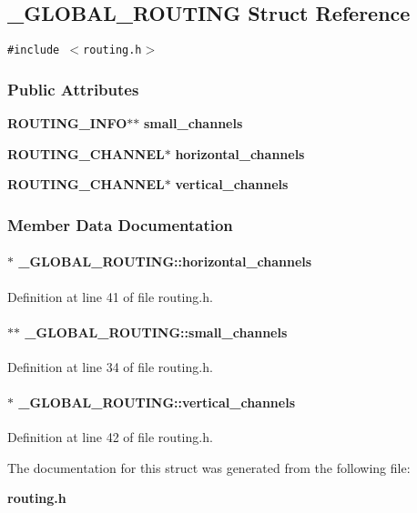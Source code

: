 \subsection{\_\-GLOBAL\_\-ROUTING  Struct Reference}
\label{_GLOBAL_ROUTING}
{\tt \#include $<$routing.h$>$}

\subsubsection*{Public Attributes}
\begin{CompactItemize}
\item 
{\bf ROUTING\_\-INFO}$\ast$$\ast$ {\bf small\_\-channels}
\item 
{\bf ROUTING\_\-CHANNEL}$\ast$ {\bf horizontal\_\-channels}
\item 
{\bf ROUTING\_\-CHANNEL}$\ast$ {\bf vertical\_\-channels}
\end{CompactItemize}


\subsubsection{Member Data Documentation}
\label{_GLOBAL_ROUTING_m1}
\paragraph{ $\ast$ \_\-GLOBAL\_\-ROUTING::horizontal\_\-channels}\hfill



Definition at line 41 of file routing.h.\label{_GLOBAL_ROUTING_m0}
\paragraph{ $\ast$$\ast$ \_\-GLOBAL\_\-ROUTING::small\_\-channels}\hfill



Definition at line 34 of file routing.h.\label{_GLOBAL_ROUTING_m2}
\paragraph{ $\ast$ \_\-GLOBAL\_\-ROUTING::vertical\_\-channels}\hfill



Definition at line 42 of file routing.h.

The documentation for this struct was generated from the following file:\begin{CompactItemize}
\item 
{\bf routing.h}\end{CompactItemize}
